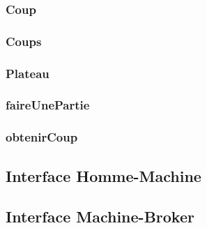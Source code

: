 \documentclass{article}
\begin{document}
\subsubsection{Coup}


\subsubsection{Coups}


\subsubsection{Plateau}


\subsubsection{faireUnePartie}


\subsubsection{obtenirCoup}


\subsection{Interface Homme-Machine}                                                                                                                                                                      
                                                                                                                                               
                                                                                                                                                                                                         
\subsection{Interface Machine-Broker}                                                                                                                                                                    
                                                                                                                                                
                                                            
\end{document}
